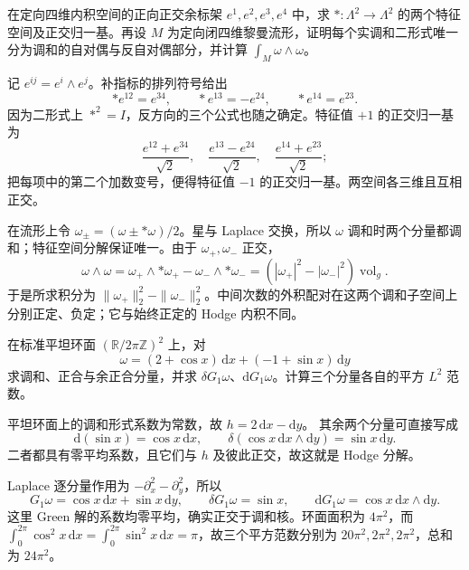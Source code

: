 \BookExercises

\begin{exercise}\label{g3:ex:self-dual-four-forms}
	在定向四维内积空间的正向正交余标架 \(e^1,e^2,e^3,e^4\) 中，求 \(*:\Lambda^2\to\Lambda^2\) 的两个特征空间及正交归一基。再设 \(M\) 为定向闭四维黎曼流形，证明每个实调和二形式唯一分为调和的自对偶与反自对偶部分，并计算 \(\int_M\omega\wedge\omega\)。
\end{exercise}
\begin{solution}
	记 \(e^{ij}=e^i\wedge e^j\)。补指标的排列符号给出
	\[
		*e^{12}=e^{34},\qquad *e^{13}=-e^{24},\qquad
		*e^{14}=e^{23}.
	\]
	因为二形式上 \(*^2=I\)，反方向的三个公式也随之确定。特征值 \(+1\) 的正交归一基为
	\[
		\frac{e^{12}+e^{34}}{\sqrt2},\quad
		\frac{e^{13}-e^{24}}{\sqrt2},\quad
		\frac{e^{14}+e^{23}}{\sqrt2};
	\]
	把每项中的第二个加数变号，便得特征值 \(-1\) 的正交归一基。两空间各三维且互相正交。

	在流形上令 \(\omega_\pm=(\omega\pm *\omega)/2\)。星与 Laplace 交换，所以 \(\omega\) 调和时两个分量都调和；特征空间分解保证唯一。由于 \(\omega_+,\omega_-\) 正交，
	\[
		\omega\wedge\omega
		=\omega_+\wedge *\omega_+
		-\omega_-\wedge *\omega_-
		=(|\omega_+|^2-|\omega_-|^2)\operatorname{vol}_g.
	\]
	于是所求积分为 \(\|\omega_+\|_2^2-\|\omega_-\|_2^2\)。中间次数的外积配对在这两个调和子空间上分别正定、负定；它与始终正定的 Hodge 内积不同。
\end{solution}

\begin{exercise}\label{g3:ex:explicit-torus-hodge-pieces}
	在标准平坦环面 \((\mathbb R/2\pi\mathbb Z)^2\) 上，对
	\[
		\omega=(2+\cos x)\,\mathrm dx+(-1+\sin x)\,\mathrm dy
	\]
	求调和、正合与余正合分量，并求 \(\delta G_1\omega\)、\(\mathrm dG_1\omega\)。计算三个分量各自的平方 \(L^2\) 范数。
\end{exercise}
\begin{solution}
	平坦环面上的调和形式系数为常数，故
	\(h=2\,\mathrm dx-\mathrm dy\)。
	其余两个分量可直接写成
	\[
		\mathrm d(\sin x)=\cos x\,\mathrm dx,\qquad
		\delta(\cos x\,\mathrm dx\wedge\mathrm dy)=\sin x\,\mathrm dy.
	\]
	二者都具有零平均系数，且它们与 \(h\) 及彼此正交，故这就是 Hodge 分解。

	Laplace 逐分量作用为 \(-\partial_x^2-\partial_y^2\)，所以
	\[
		G_1\omega=\cos x\,\mathrm dx+\sin x\,\mathrm dy,
		\qquad
		\delta G_1\omega=\sin x,\qquad
		\mathrm dG_1\omega=\cos x\,\mathrm dx\wedge\mathrm dy.
	\]
	这里 Green 解的系数均零平均，确实正交于调和核。环面面积为 \(4\pi^2\)，而 \(\int_0^{2\pi}\cos^2x\,\mathrm dx=\int_0^{2\pi}\sin^2x\,\mathrm dx=\pi\)，故三个平方范数分别为
	\(20\pi^2,2\pi^2,2\pi^2\)，总和为 \(24\pi^2\)。
\end{solution}

